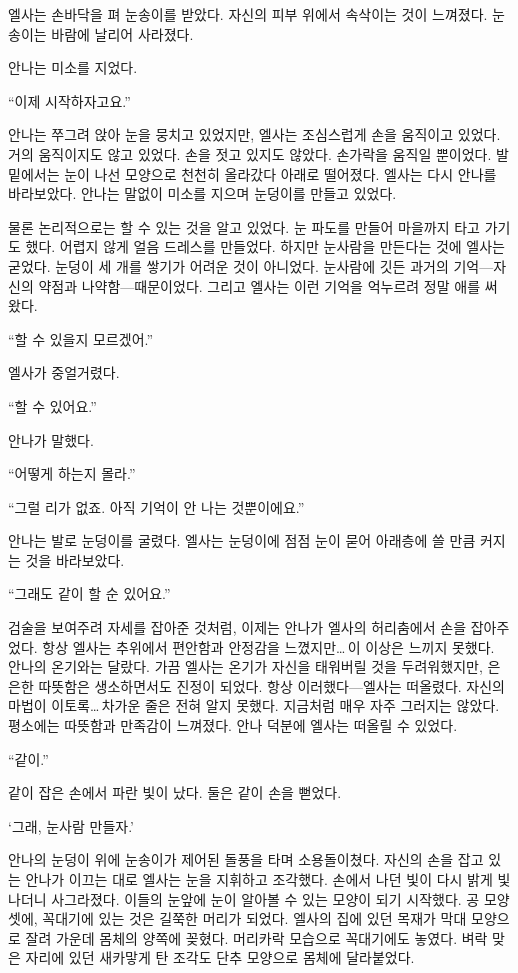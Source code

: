 엘사는 손바닥을 펴 눈송이를 받았다. 자신의 피부 위에서 속삭이는 것이 느껴졌다. 눈송이는 바람에 날리어 사라졌다.

안나는 미소를 지었다.

``이제 시작하자고요.''

안나는 쭈그려 앉아 눈을 뭉치고 있었지만, 엘사는 조심스럽게 손을 움직이고 있었다. 거의 움직이지도 않고 있었다. 손을 젓고 있지도 않았다. 손가락을 움직일 뿐이었다. 발밑에서는 눈이 나선 모양으로 천천히 올라갔다 아래로 떨어졌다. 엘사는 다시 안나를 바라보았다. 안나는 말없이 미소를 지으며 눈덩이를 만들고 있었다.

물론 논리적으로는 할 수 있는 것을 알고 있었다. 눈 파도를 만들어 마을까지 타고 가기도 했다. 어렵지 않게 얼음 드레스를 만들었다. 하지만 눈사람을 만든다는 것에 엘사는 굳었다. 눈덩이 세 개를 쌓기가 어려운 것이 아니었다. 눈사람에 깃든 과거의 기억—자신의 약점과 나약함—때문이었다. 그리고 엘사는 이런 기억을 억누르려 정말 애를 써 왔다.

``할 수 있을지 모르겠어.''

엘사가 중얼거렸다.

``할 수 있어요.''

안나가 말했다.

``어떻게 하는지 몰라.''

``그럴 리가 없죠. 아직 기억이 안 나는 것뿐이에요.''

안나는 발로 눈덩이를 굴렸다. 엘사는 눈덩이에 점점 눈이 묻어 아래층에 쓸 만큼 커지는 것을 바라보았다.

``그래도 같이 할 순 있어요.''

검술을 보여주려 자세를 잡아준 것처럼, 이제는 안나가 엘사의 허리춤에서 손을 잡아주었다. 항상 엘사는 추위에서 편안함과 안정감을 느꼈지만\ldots\,이 이상은 느끼지 못했다. 안나의 온기와는 달랐다. 가끔 엘사는 온기가 자신을 태워버릴 것을 두려워했지만, 은은한 따뜻함은 생소하면서도 진정이 되었다. 항상 이러했다—엘사는 떠올렸다. 자신의 마법이 이토록\ldots\,차가운 줄은 전혀 알지 못했다. 지금처럼 매우 자주 그러지는 않았다. 평소에는 따뜻함과 만족감이 느껴졌다. 안나 덕분에 엘사는 떠올릴 수 있었다.

``같이.''

같이 잡은 손에서 파란 빛이 났다. 둘은 같이 손을 뻗었다.

`그래, 눈사람 만들자.'

안나의 눈덩이 위에 눈송이가 제어된 돌풍을 타며 소용돌이쳤다. 자신의 손을 잡고 있는 안나가 이끄는 대로 엘사는 눈을 지휘하고 조각했다. 손에서 나던 빛이 다시 밝게 빛나더니 사그라졌다. 이들의 눈앞에 눈이 알아볼 수 있는 모양이 되기 시작했다. 공 모양 셋에, 꼭대기에 있는 것은 길쭉한 머리가 되었다. 엘사의 집에 있던 목재가 막대 모양으로 잘려 가운데 몸체의 양쪽에 꽂혔다. 머리카락 모습으로 꼭대기에도 놓였다. 벼락 맞은 자리에 있던 새카맣게 탄 조각도 단추 모양으로 몸체에 달라붙었다.

